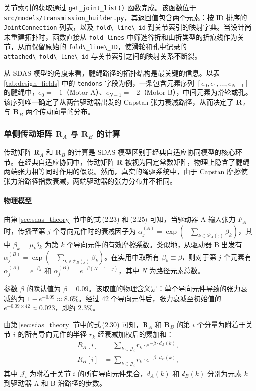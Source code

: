 \documentclass[12pt,a4paper]{report}
\begin{document}
关节索引的获取通过 \lstinline{get_joint_list()} 函数完成。该函数位于 \lstinline{src/models/transmission_builder.py}，其返回值包含两个元素：按 ID 排序的 \lstinline{JointConnection} 列表，以及 \lstinline{fold\_line\_id} 到关节索引的映射字典。当设计尚未重建拓扑时，函数直接从 \lstinline{fold_lines} 中筛选谷折和山折类型的折痕线作为关节，从而保留原始的 \lstinline{fold\_line\_ID}，使滑轮和孔中记录的 \lstinline{attached\_fold\_line\_id} 与关节索引之间的映射关系不断裂。

从 SDAS 模型的角度来看，腱绳路径的拓扑结构是最关键的信息。以表\,\ref{tab:design_fields} 中的 \lstinline{tendons} 字段为例，一条包含元素序列 $[e_0, e_1, \dots, e_{N-1}]$ 的腱绳中，$e_0 = -1$（Motor A）、$e_{N-1} = -2$（Motor B），中间元素为滑轮或孔。该序列唯一确定了从两台驱动器出发的 Capstan 张力衰减路径，从而决定了 $\mathbf{R}_A$ 与 $\mathbf{R}_B$ 两个传动向量的分布。


\subsubsection{单侧传动矩阵 $\mathbf{R}_A$ 与 $\mathbf{R}_B$ 的计算}
\label{sec:RA_RB_computation}

传动矩阵 $\mathbf{R}_A$ 和 $\mathbf{R}_B$ 的计算是 SDAS 模型区别于经典自适应协同模型的核心环节。在经典自适应协同中，传动矩阵 $\mathbf{R}$ 被视为固定常数矩阵，物理上隐含了腱绳两端张力相等同时作用的假设。然而，真实的绳驱系统中，由于 Capstan 摩擦使张力沿路径指数衰减，两端驱动器的张力分布并不相同。

\paragraph{物理模型}

由第\,\ref{sec:sdas_theory} 节中的式\,(2.23) 和\,(2.25) 可知，当驱动器 A 输入张力 $F_A$ 时，传播至第 $j$ 个导向元件时的衰减因子为 $\alpha_j^{(A)} = \exp(-\sum_{k \in \mathcal{P}_A(j)} \beta_k)$，其中 $\beta_k = \mu_k\theta_k$ 为第 $k$ 个导向元件的有效摩擦系数。类似地，从驱动器 B 出发有 $\alpha_j^{(B)} = \exp(-\sum_{k \in \mathcal{P}_B(j)} \beta_k)$。在实用中取所有 $\beta_k \equiv \beta$，则对于第 $j$ 个元素有 $\alpha_j^{(A)} = e^{-\beta j}$ 和 $\alpha_j^{(B)} = e^{-\beta (N-1-j)}$，其中 $N$ 为路径元素总数。

参数 $\beta$ 的默认值为 $\beta = 0.09$。该取值的物理含义是：单个导向元件导致的张力衰减约为 $1 - e^{-0.09} \approx 8.6\%$。经过 42 个导向元件后，张力衰减至初始值的 $e^{-0.09 \times 42} \approx 0.023$，即约 2.3\%。

由第\,\ref{sec:sdas_theory} 节中的式\,(2.30) 可知，$\mathbf{R}_A$ 和 $\mathbf{R}_B$ 的第 $i$ 个分量为附着于关节 $i$ 的所有导向元件的半径 $r_k$ 经衰减加权后的累加和：
\begin{align}
    R_A[i] &= \sum_{k \in \mathcal{J}_i} r_k \cdot e^{-\beta \cdot d_A(k)}, \label{eq:RA_impl}\\
    R_B[i] &= \sum_{k \in \mathcal{J}_i} r_k \cdot e^{-\beta \cdot d_B(k)}, \label{eq:RB_impl}
\end{align}
其中 $\mathcal{J}_i$ 为附着于关节 $i$ 的所有导向元件集合，$d_A(k)$ 和 $d_B(k)$ 分别为元素 $k$ 到驱动器 A 和 B 沿路径的步数。
\end{document}
